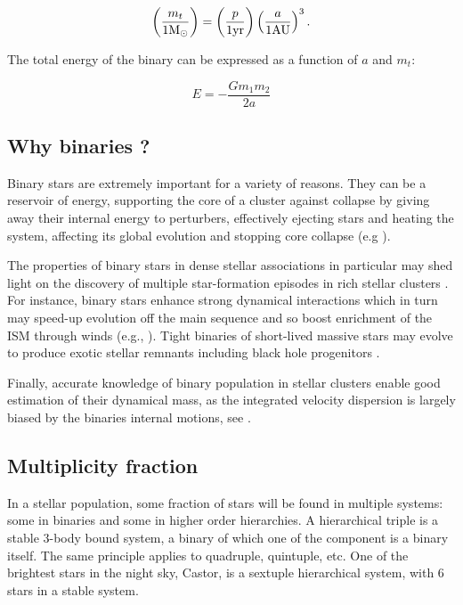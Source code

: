 \begin{equation}
\left( \frac{m_t}{1 {\textrm{M}_\odot}} \right) = \left( \frac{p}{1 \textrm{yr}} \right) \left( \frac{a}{1 \textrm{AU}} \right)^3 .
\end{equation}


The total energy of the binary can be expressed as a function of $a$ and $m_t$:

\begin{equation}
E = - \frac{G m_1 m_2}{2a} 
\end{equation}

\subsection{Why binaries ?}

Binary stars are extremely important for a variety of reasons. They can be a reservoir of energy, supporting the core of a cluster against collapse by giving away their internal energy to perturbers, effectively ejecting stars and heating the system, affecting its global evolution and stopping core collapse (e.g \citealt{Heggie1992}).

The properties of binary stars in dense stellar associations in particular may shed light on the discovery of multiple star-formation episodes in rich stellar clusters \citep{anderson2009}. For instance, binary stars enhance strong dynamical interactions which in turn may speed-up evolution off the main sequence and so boost enrichment of the ISM through winds (e.g., \citealt{Tailo2015}). Tight binaries of short-lived massive stars may evolve to produce exotic stellar remnants including black hole progenitors \citep{bacon1996,davies2009}. 

Finally, accurate knowledge of binary population in stellar clusters enable good estimation of their dynamical mass, as the integrated velocity dispersion is largely biased by the binaries internal motions, see \cite{Rubenstein1997}.

\subsection{Multiplicity fraction}

In a stellar population, some fraction of stars will be found in multiple systems: some  in binaries and some in higher order hierarchies. A hierarchical triple is a stable 3-body bound system, a binary of which one of the component is a binary itself. The same principle applies to quadruple, quintuple, etc. One of the brightest stars in the night sky, Castor, is a sextuple hierarchical system, with 6 stars in a stable system.

